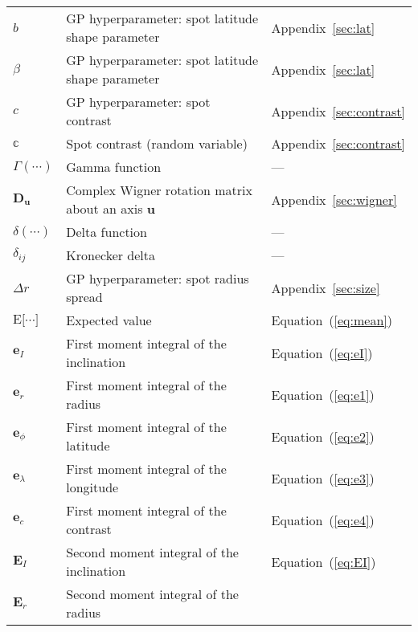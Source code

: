 \begin{center}
\begin{longtable}{W{c}{1cm} W{l}{9cm} W{l}{2cm}}
        $b$
         & GP hyperparameter: spot latitude shape parameter
         & Appendix~\ref{sec:lat}
        \\
        $\beta$
         & GP hyperparameter: spot latitude shape parameter
         & Appendix~\ref{sec:lat}
        \\
        $c$
         & GP hyperparameter: spot contrast
         & Appendix~\ref{sec:contrast}
        \\
        $\mathbb{c}$
         & Spot contrast (random variable)
         & Appendix~\ref{sec:contrast}
        \\
        $\Gamma(\cdots)$
         & Gamma function
         & ---
        \\
        $\mathbf{D}_\mathbf{u}$
         & Complex Wigner rotation matrix about an axis $\mathbf{u}$
         & Appendix~\ref{sec:wigner}
        \\
        $\delta(\cdots)$
         & Delta function
         & ---
        \\
        $\delta_{ij}$
         & Kronecker delta
         & ---
        \\
        $\Delta r$
         & GP hyperparameter: spot radius spread
         & Appendix~\ref{sec:size}
        \\
        $\mathrm{E}\big[ \cdots \big]$
         & Expected value
         & Equation~(\ref{eq:mean})
        \\
        $\mathbf{e}_I$
         & First moment integral of the inclination
         & Equation~(\ref{eq:eI})
        \\
        $\mathbf{e}_r$
         & First moment integral of the radius
         & Equation~(\ref{eq:e1})
        \\
        $\mathbf{e}_\phi$
         & First moment integral of the latitude
         & Equation~(\ref{eq:e2})
        \\
        $\mathbf{e}_\lambda$
         & First moment integral of the longitude
         & Equation~(\ref{eq:e3})
        \\
        $\mathbf{e}_c$
         & First moment integral of the contrast
         & Equation~(\ref{eq:e4})
        \\
        $\mathbf{E}_I$
         & Second moment integral of the inclination
         & Equation~(\ref{eq:EI})
        \\
        $\mathbf{E}_r$
         & Second moment integral of the radius

\end{longtable}
\end{center}
